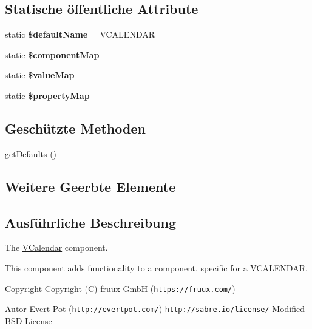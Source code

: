 \subsection*{Statische öffentliche Attribute}
\begin{DoxyCompactItemize}
\item 
\mbox{\label{class_sabre_1_1_v_object_1_1_component_1_1_v_calendar_a69c8263cfc1f1c19a89c933dbddbf6a2}} 
static {\bfseries \$default\+Name} = \textquotesingle{}V\+C\+A\+L\+E\+N\+D\+AR\textquotesingle{}
\item 
static {\bfseries \$component\+Map}
\item 
static {\bfseries \$value\+Map}
\item 
static {\bfseries \$property\+Map}
\end{DoxyCompactItemize}
\subsection*{Geschützte Methoden}
\begin{DoxyCompactItemize}
\item 
\mbox{\hyperlink{class_sabre_1_1_v_object_1_1_component_1_1_v_calendar_a2653f373e72648003c2435a92a609fcb}{get\+Defaults}} ()
\end{DoxyCompactItemize}
\subsection*{Weitere Geerbte Elemente}


\subsection{Ausführliche Beschreibung}
The \mbox{\hyperlink{class_sabre_1_1_v_object_1_1_component_1_1_v_calendar}{V\+Calendar}} component.

This component adds functionality to a component, specific for a V\+C\+A\+L\+E\+N\+D\+AR.

\begin{DoxyCopyright}{Copyright}
Copyright (C) fruux GmbH (\href{https://fruux.com/}{\tt https\+://fruux.\+com/}) 
\end{DoxyCopyright}
\begin{DoxyAuthor}{Autor}
Evert Pot (\href{http://evertpot.com/}{\tt http\+://evertpot.\+com/})  \href{http://sabre.io/license/}{\tt http\+://sabre.\+io/license/} Modified B\+SD License 
\end{DoxyAuthor}


